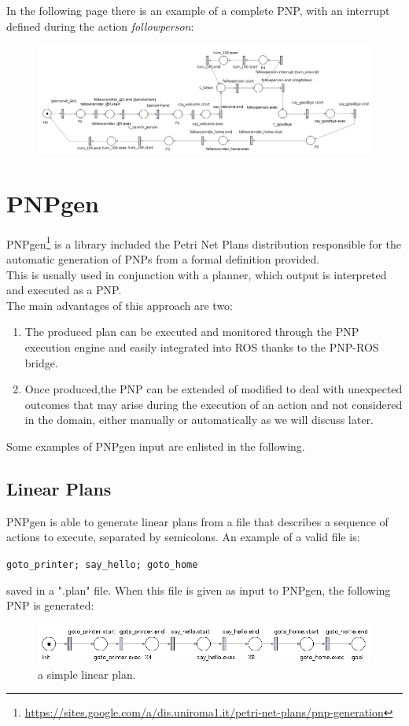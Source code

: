 \documentclass[pdftex,12pt,a4paper]{report}
\begin{document}
\noindent In the following page there is an example of a complete PNP, with an interrupt defined during the action \textit{followperson}:
\newline
\begin{figure}[H]
	\centering
	\includegraphics[scale=0.4,  trim=20mm 10mm 10mm 10mm]{images/go_and_follow_person.png} %
\end{figure}

\section{PNPgen}
PNPgen\footnote{\url{https://sites.google.com/a/dis.uniroma1.it/petri-net-plans/pnp-generation}}\cite{carlucci2015explicit}%
is a library included the Petri Net Plans distribution responsible for the automatic generation of PNPs from a formal definition provided.\\
This is usually used in conjunction with a planner, which output is interpreted and executed as a PNP.\\
The main advantages of this approach are two:
\begin{enumerate}
\item The produced plan can be executed and monitored through the PNP execution engine and easily integrated into ROS thanks to the PNP-ROS bridge.
\item Once produced,the PNP can be extended of modified to deal with unexpected outcomes that may arise during the execution of an action and not considered in the domain, either manually or automatically as we will discuss later.
\end{enumerate} 

Some examples of PNPgen input are enlisted in the following.
\subsection{Linear Plans}
PNPgen is able to generate linear plans from a file that describes a sequence of actions to execute, separated by semicolons. An example of a valid file is:
\begin{center}
\texttt{goto\_printer; say\_hello; goto\_home}
\end{center}
saved in a ".plan" file. When this file is given as input to PNPgen, the following PNP is generated:
\begin{figure}[H]
	\includegraphics[scale=0.6]{images/linear_plan.png}
	\caption{a simple linear plan.}
\end{figure}
\end{document}
